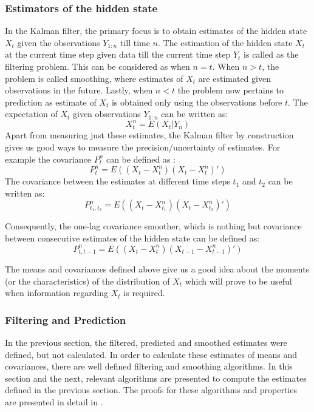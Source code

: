 \documentclass{article}
\begin{document}
\subsubsection{Estimators of the hidden state}

In the Kalman filter, the primary focus is to obtain estimates of the hidden state $X_{t}$ given the observations $Y_{1:n}$ till time $n$. The estimation of the hidden state $X_t$ at the current time step given data till the current time step $Y_t$  is called as the filtering problem. This can be considered as when $n=t$.  When $n>t$, the problem is called smoothing, where estimates of $X_t$ are estimated given observations in the future. Lastly, when $n<t$ the problem now pertains to prediction as estimate of $X_t$ is obtained only using the observations before $t$. The expectation of $X_t$ given observations $Y_{1:n}$ can be written as: 
\begin{equation} \label{eq:2}
  X_{t}^n=E(X_t | Y_n)  
\end{equation}
Apart from measuring just these estimates, the Kalman filter by construction gives us good ways to measure the precision/uncertainty of estimates. For example the covariance $P_{t}^n$ can be defined as :
\begin{equation} \label{eq:3}
  P_t^{n} = E((X_t-X_t^n)(X_t-X_t^n)')  
\end{equation}
The covariance between the estimates at different time steps $t_1$ and $t_2$ can be written as:
\begin{equation} \label{eq:4}
  P_{t_1,t_2}^{n} = E((X_t-X_{t_1}^{n})(X_t-X_{t_2}^{n})')  
\end{equation}

Consequently, the one-lag covariance smoother, which is nothing but covariance between consecutive estimates of the hidden state can be defined as:
\begin{equation} \label{eq:5}
  P_{t,t-1}^{n} = E((X_t-X_{t}^{n})(X_{t-1}-X_{t-1}^{n})')  
\end{equation}

The means and covariances defined above give us a good idea about the moments (or the characteristics) of the distribution of $X_t$ which will prove to be useful when information regarding $X_t$ is required. 

\subsubsection{Filtering and Prediction}\label{ssec:filtering}
In the previous section, the filtered, predicted and smoothed estimates were defined, but not calculated. In order to calculate these estimates of means and covariances, there are well defined filtering and smoothing algorithms. In this section and the next, relevant algorithms are presented to compute the estimates defined in the previous section. The proofs for these algorithms and properties are presented in detail in \cite{shumstof2000}. 
\end{document}
